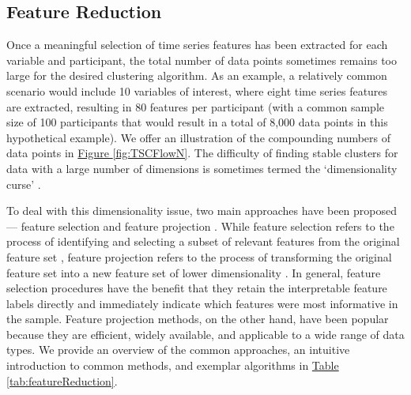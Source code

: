 \documentclass[man, 12pt, a4paper, mask, floatsintext]{apa7}
\theoremstyle{break}
\theoremstyle{plain}
\newcommand{\fgrref}[2][]{\hyperref[#2]{Figure \ref*{#2}#1}}
\newcommand{\tblref}[2][]{\hyperref[#2]{Table \ref*{#2}#1}}
\begin{document}
\subsection{Feature Reduction}
Once a meaningful selection of time series features has been extracted for each variable and participant, the total number of data points sometimes remains too large for the desired clustering algorithm. As an example, a relatively common scenario would include 10 variables of interest, where eight time series features are extracted, resulting in 80 features per participant (with a common sample size of 100 participants that would result in a total of 8,000 data points in this hypothetical example). We offer an illustration of the compounding numbers of data points in \fgrref{fig:TSCFlowN}. The difficulty of finding stable clusters for data with a large number of dimensions is sometimes termed the `dimensionality curse' \citep[e.g.,][]{altman2018}. 

To deal with this dimensionality issue, two main approaches have been proposed --- feature selection and feature projection \citep[e.g.,][]{erdogmus2008}. While feature selection refers to the process of identifying and selecting a subset of relevant features from the original feature set \citep{alelyani2014}, feature projection refers to the process of transforming the original feature set into a new feature set of lower dimensionality \citep[][]{carreira-perpinan1997}. In general, feature selection procedures have the benefit that they retain the interpretable feature labels directly and immediately indicate which features were most informative in the sample. Feature projection methods, on the other hand, have been popular because they are efficient, widely available, and applicable to a wide range of data types. We provide an overview of the common approaches, an intuitive introduction to common methods, and exemplar algorithms in \tblref{tab:featureReduction}. 
\end{document}

